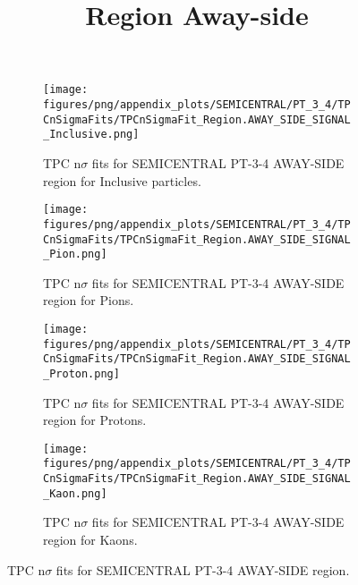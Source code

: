             \begin{figure}[H]
                \title{Region Away-side}
                \begin{subfigure}[b]{0.5\textwidth}
                    \centering
                    \texttt{[image: figures/png/appendix\_plots/SEMICENTRAL/PT\_3\_4/TPCnSigmaFits/TPCnSigmaFit\_Region.AWAY\_SIDE\_SIGNAL\_Inclusive.png]}
                    \caption{TPC n$\sigma$ fits for SEMICENTRAL PT-3-4 AWAY-SIDE region for Inclusive particles.}
                    \label{fig:appendix_SEMICENTRAL_PT-3-4_AWAY_SIDE_SIGNAL_Inclusive}
                \end{subfigure}
                \begin{subfigure}[b]{0.5\textwidth}
                    \centering
                    \texttt{[image: figures/png/appendix\_plots/SEMICENTRAL/PT\_3\_4/TPCnSigmaFits/TPCnSigmaFit\_Region.AWAY\_SIDE\_SIGNAL\_Pion.png]}
                    \caption{TPC n$\sigma$ fits for SEMICENTRAL PT-3-4 AWAY-SIDE region for Pions.}
                    \label{fig:appendix_SEMICENTRAL_PT-3-4_AWAY_SIDE_SIGNAL_Pion}
                \end{subfigure}
                \begin{subfigure}[b]{0.5\textwidth}
                    \centering
                    \texttt{[image: figures/png/appendix\_plots/SEMICENTRAL/PT\_3\_4/TPCnSigmaFits/TPCnSigmaFit\_Region.AWAY\_SIDE\_SIGNAL\_Proton.png]}
                    \caption{TPC n$\sigma$ fits for SEMICENTRAL PT-3-4 AWAY-SIDE region for Protons.}
                    \label{fig:appendix_SEMICENTRAL_PT-3-4_AWAY_SIDE_SIGNAL_Proton}
                \end{subfigure}
                \begin{subfigure}[b]{0.5\textwidth}
                    \centering
                    \texttt{[image: figures/png/appendix\_plots/SEMICENTRAL/PT\_3\_4/TPCnSigmaFits/TPCnSigmaFit\_Region.AWAY\_SIDE\_SIGNAL\_Kaon.png]}
                    \caption{TPC n$\sigma$ fits for SEMICENTRAL PT-3-4 AWAY-SIDE region for Kaons.}
                    \label{fig:appendix_SEMICENTRAL_PT-3-4_AWAY_SIDE_SIGNAL_Kaon}
                \end{subfigure}
                \caption{TPC n$\sigma$ fits for SEMICENTRAL PT-3-4 AWAY-SIDE region.}
                \label{fig:appendix_SEMICENTRAL_PT-3-4_AWAY_SIDE_SIGNAL}
            \end{figure}
